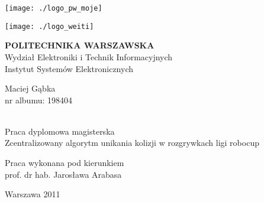 \begin{titlepage}
\linespread{1.1}
\hspace{0.4cm}
 \begin{minipage}{0.4\textwidth}
	\begin{flushleft} 
	\texttt{[image: ./logo\_pw\_moje]}
	\end{flushleft}
\end{minipage}
\begin{minipage}{0.4\textwidth}
	\begin{flushright} 
	\texttt{[image: ./logo\_weiti]}
	\end{flushright}
\end{minipage}
\begin{flushleft}


\end{flushleft}
\vspace{0.1cm}
\begin{center}
{\textbf{\LARGE POLITECHNIKA WARSZAWSKA}}\\
\Large Wydział Elektroniki i Technik Informacyjnych\\
\Large Instytut Systemów Elektronicznych\\[2.5cm]
 \begin{minipage}{0.9\textwidth}
	\begin{flushleft} 
	\Large
	Maciej Gąbka\\nr albumu: 198404
	\end{flushleft}
\end{minipage}
\\[1.5cm]
{\Large Praca dyplomowa magisterska}\\
 \Huge Zcentralizowany algorytm unikania kolizji w rozgrywkach ligi robocup\\[2.0cm]
\begin{flushleft} \large
\hspace{5.5cm}Praca wykonana pod kierunkiem \\ 
\hspace{5.5cm}prof. dr hab. Jarosława Arabasa
\end{flushleft}
\vfill
{\large Warszawa 2011}
\end{center}
\end{titlepage}
